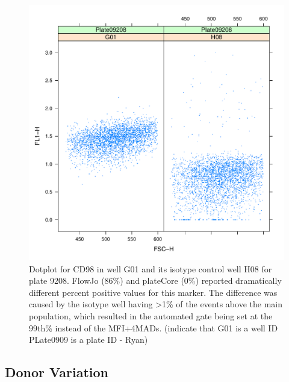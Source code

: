 \documentclass[12pt]{article}
\begin{document}
\clearpage
\begin{figure}
\centering
\includegraphics{fjVSr2.pdf}
\caption{Dotplot for CD98 in well G01 and its isotype control well H08 for plate 9208. FlowJo
(86\%) and plateCore (0\%) reported dramatically different percent positive values for this marker. The 
difference was caused by the isotype well having >1\% of the events above the main population, which
resulted in the automated gate being set at the 99th\% instead of the
MFI+4MADs. (indicate that G01 is a well ID PLate0909 is a plate ID - Ryan)}
\label{fig:disagree}
\end{figure}


\clearpage
\subsection*{Donor Variation}
\end{document}
